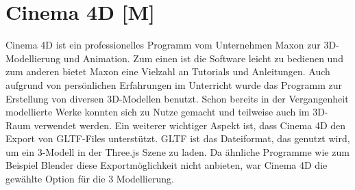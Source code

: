 \section{Cinema 4D [M]}
Cinema 4D ist ein professionelles Programm vom Unternehmen Maxon zur 3D-Modellierung und Animation. Zum einen ist die Software leicht zu bedienen und zum anderen bietet Maxon eine Vielzahl an Tutorials und Anleitungen. Auch aufgrund von persönlichen Erfahrungen im Unterricht wurde das Programm zur Erstellung von diversen 3D-Modellen benutzt. Schon bereits in der Vergangenheit modellierte Werke konnten sich zu Nutze gemacht und teilweise auch im 3D-Raum verwendet werden. Ein weiterer wichtiger Aspekt ist, dass Cinema 4D den Export von GLTF-Files unterstützt. GLTF ist das Dateiformat, das genutzt wird, um ein 3-Modell in der Three.js Szene zu laden. Da ähnliche Programme wie zum Beispiel Blender diese Exportmöglichkeit nicht anbieten, war Cinema 4D die gewählte Option für die 3 Modellierung. 
\cite{Cinema4D}